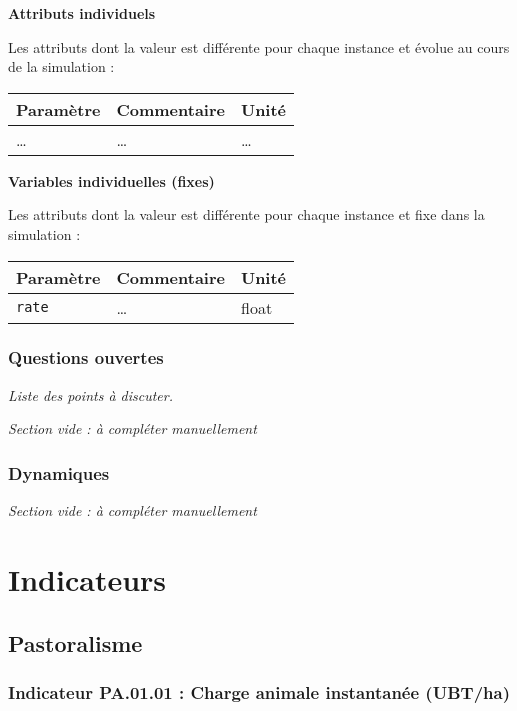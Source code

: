 \documentclass[
]{article}
\begin{document}
\textbf{Attributs individuels}

Les attributs dont la valeur est différente pour chaque instance et
évolue au cours de la simulation :

\begin{longtable}[]{@{}lll@{}}
\toprule\noalign{}
\textbf{Paramètre} & \textbf{Commentaire} & \textbf{Unité} \\
\midrule\noalign{}
\endhead
\bottomrule\noalign{}
\endlastfoot
\ldots{} & \ldots{} & \ldots{} \\
\end{longtable}

\textbf{Variables individuelles (fixes)}

Les attributs dont la valeur est différente pour chaque instance et fixe
dans la simulation :

\begin{longtable}[]{@{}lll@{}}
\toprule\noalign{}
\textbf{Paramètre} & \textbf{Commentaire} & \textbf{Unité} \\
\midrule\noalign{}
\endhead
\bottomrule\noalign{}
\endlastfoot
\texttt{rate} & \ldots{} & float \\
\end{longtable}

\subsubsection{Questions ouvertes}\label{questions-ouvertes-13}

\emph{Liste des points à discuter.}

\emph{Section vide : à compléter manuellement}

\subsubsection{Dynamiques}\label{dynamiques-13}

\emph{Section vide : à compléter manuellement}

\section{Indicateurs}\label{indicateurs}

\subsection{Pastoralisme}\label{pastoralisme}

\subsubsection{Indicateur PA.01.01 : Charge animale instantanée
(UBT/ha)}\label{indicateur-pa.01.01-charge-animale-instantanuxe9e-ubtha}
\end{document}
